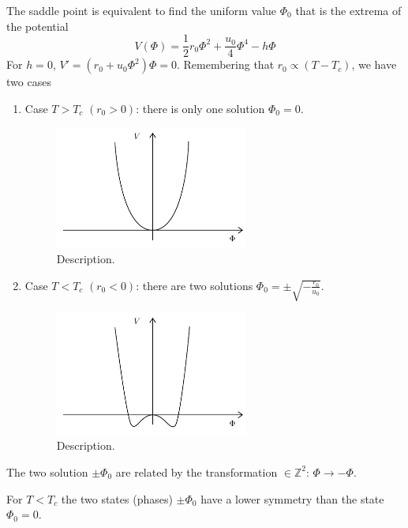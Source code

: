 \documentclass[../main/main.tex]{subfiles}
\begin{document}
The saddle point is equivalent to find the uniform value \( \Phi _0 \)  that is the extrema of the potential
\begin{equation}
  V (\Phi ) = \frac{1}{2} r_0 \Phi ^2 + \frac{u_0}{4} \Phi ^4 - h \Phi
\end{equation}
For \( h=0 \), \( V' = (r_0 + u_0 \Phi ^2) \Phi = 0 \).
Remembering that \( r_0 \propto (T-T_c) \), we have two cases
\begin{enumerate}
\item Case \( T>T_c \) \( (r_0>0) \): there is only one solution \( \Phi _0 =0 \).
\begin{figure}[h!]
\centering
\includegraphics[width=0.6\textwidth]{../lessons/n_image/1.pdf}
\caption{\label{fig:} Description.}
\end{figure}

  \item Case \( T<T_c \) \( (r_0<0) \): there are two solutions \( \Phi _0 = \pm \sqrt{-\frac{r_0}{u_0}}  \).
  \begin{figure}[h!]
  \centering
  \includegraphics[width=0.6\textwidth]{../lessons/n_image/2.pdf}
  \caption{\label{fig:} Description.}
  \end{figure}

\end{enumerate}
\begin{remark}
The two solution \( \pm \Phi _0 \) are related by the transformation \( \in \mathbb{Z}^2 \): \( \Phi \rightarrow - \Phi  \).
\end{remark}
\begin{remark}
For \( T < T_c \) the two states (phases) \( \pm \Phi _0 \) have a lower symmetry than the state \( \Phi _0 = 0 \).
\end{remark}
\end{document}
